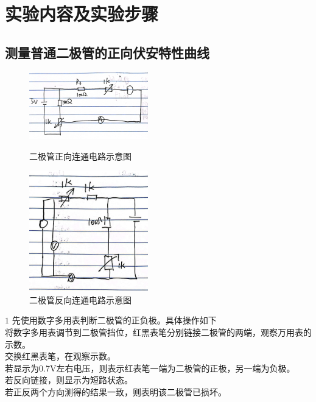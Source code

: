\documentclass{ctexart}
\begin{document}
\section{实验内容及实验步骤}
  \subsection{测量普通二极管的正向伏安特性曲线}

  \begin{figure}[b]
    \centering
    \begin{minipage}[b]{0.48\textwidth}
      \centering
      \includegraphics[width=0.46\textwidth]{zhengxiangdianlu.jpg}
      \caption{二极管正向连通电路示意图}\label{zhengxiangdianlu.jpg}
    \end{minipage}
    \begin{minipage}[b]{0.48\textwidth}
      \centering
      \includegraphics[width=0.46\textwidth]{fanxiangdianlu.jpg}
      \caption{二极管反向连通电路示意图}\label{fanxiangdianlu}
    \end{minipage}
  \end{figure}

  \(1\) 先使用数字多用表判断二极管的正负极。具体操作如下\\
  将数字多用表调节到二极管挡位，红黑表笔分别链接二极管的两端，观察万用表的示数。\\
  交换红黑表笔，在观察示数。\\
  若显示为0.7V左右电压，则表示红表笔一端为二极管的正极，另一端为负极。\\
  若反向链接，则显示为短路状态。\\
  若正反两个方向测得的结果一致，则表明该二极管已损坏。
\end{document}
